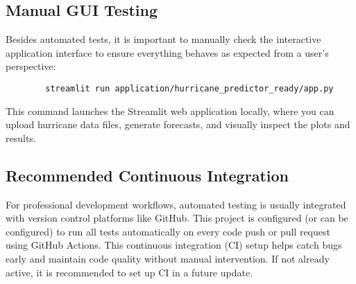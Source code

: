 \subsection{Manual GUI Testing}

Besides automated tests, it is important to manually check the interactive application interface to ensure everything behaves as expected from a user’s perspective:

\begin{framed}
	\begin{verbatim}
		streamlit run application/hurricane_predictor_ready/app.py
	\end{verbatim}
\end{framed}

This command launches the Streamlit web application locally, where you can upload hurricane data files, generate forecasts, and visually inspect the plots and results.

\subsection{Recommended Continuous Integration}

For professional development workflows, automated testing is usually integrated with version control platforms like GitHub. This project is configured (or can be configured) to run all tests automatically on every code push or pull request using GitHub Actions. This continuous integration (CI) setup helps catch bugs early and maintain code quality without manual intervention. If not already active, it is recommended to set up CI in a future update.



